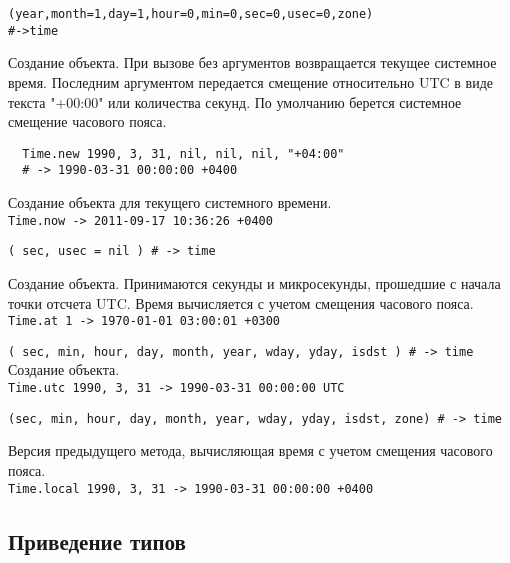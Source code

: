 \begin{methodlist}
  \begin{alltt}
  (year, month = 1, day = 1, hour = 0, min = 0, sec = 0, usec = 0, zone)
  # -> time\
  \end{alltt}
  Создание объекта. При вызове без аргументов возвращается текущее системное время. Последним аргументом передается смещение относительно UTC в виде текста "+00:00" или количества секунд. По умолчанию берется системное смещение часового пояса.
  \begin{verbatim}
  Time.new 1990, 3, 31, nil, nil, nil, "+04:00" 
  # -> 1990-03-31 00:00:00 +0400
  \end{verbatim} 
   
  Создание объекта для текущего системного времени. 
  \\\verb!Time.now -> 2011-09-17 10:36:26 +0400!
 
  \verb!( sec, usec = nil ) # -> time!

  Создание объекта. Принимаются секунды и микросекунды, прошедшие с начала точки отсчета UTC. Время вычисляется с учетом смещения часового пояса. 
  \\\verb!Time.at 1 -> 1970-01-01 03:00:01 +0300!

  \verb!( sec, min, hour, day, month, year, wday, yday, isdst ) # -> time!
  \alias{gm} 
  Создание объекта.   
  \\\verb!Time.utc 1990, 3, 31 -> 1990-03-31 00:00:00 UTC!
 
  \verb!(sec, min, hour, day, month, year, wday, yday, isdst, zone) # -> time! 

  Версия предыдущего метода, вычисляющая время с учетом смещения часового пояса. 
  \\\verb!Time.local 1990, 3, 31 -> 1990-03-31 00:00:00 +0400!
\end{methodlist}

\subsection*{Приведение типов} 

